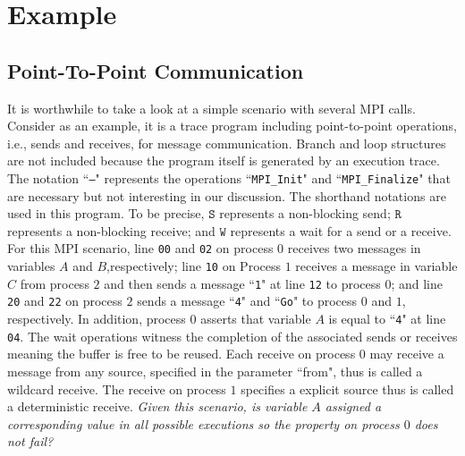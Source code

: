 \section{Example}\label{sec:example}
\subsection{Point-To-Point Communication}
It is worthwhile to take a look at a simple scenario with several MPI calls. Consider  as an example, it is a trace program including point-to-point operations, i.e., sends and receives, for message communication. Branch and loop structures are not included because the program itself is generated by an execution trace. The notation ``\texttt{---}" represents the operations ``\texttt{MPI\_Init}" and ``\texttt{MPI\_Finalize}" that are necessary but not interesting in our discussion. The shorthand notations are used in this program. To be precise, $\mathtt{S}$ represents a non-blocking send; $\mathtt{R}$ represents a non-blocking receive; and $\mathtt{W}$ represents a wait for a send or a receive. For this MPI scenario, line \texttt{00} and \texttt{02} on process $0$ receives two messages in variables $A$ and $B$,respectively; line \texttt{10} on Process $1$ receives a message in variable $C$ from process $2$ and then sends a message ``\texttt{1}" at line \texttt{12} to process $0$; and line \texttt{20} and \texttt{22} on process $2$ sends a message ``\texttt{4}" and ``\texttt{Go}" to process $0$ and $1$, respectively. In addition, process $0$ asserts that variable $A$ is equal to ``\texttt{4}" at line \texttt{04}. The wait operations witness the completion of the associated sends or receives meaning the buffer is free to be reused. Each receive on process $0$ may receive a message from any source, specified in the parameter ``from", thus is called a wildcard receive. The receive on process $1$ specifies a explicit source thus is called a deterministic receive. \textit{Given this scenario, is variable $A$ assigned a corresponding value in all possible executions so the property on process $0$ does not fail?}

